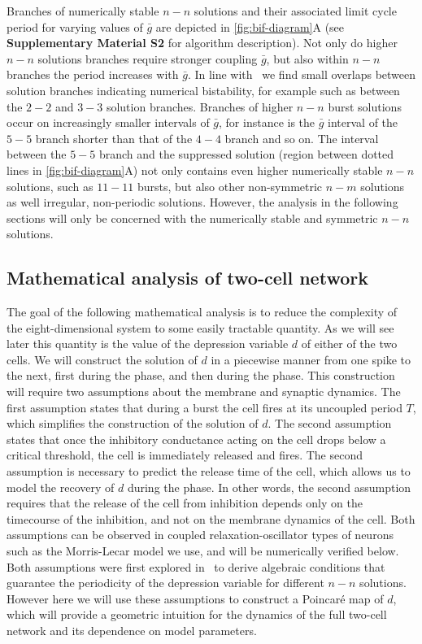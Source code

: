 Branches of numerically stable \(n-n\) solutions and their associated limit cycle period for varying values of \(\bar g\) are depicted in \cref{fig:bif-diagram}A (see \textbf{Supplementary Material S2} for algorithm description).
Not only do higher \(n-n\) solutions branches require stronger coupling \(\bar g\), but also within \(n-n\) branches the period increases with \(\bar g\).
In line with~\citet{bose2011} we find small overlaps between solution branches indicating numerical bistability, for example such as between the \(2-2\) and \(3-3\) solution branches.
Branches of higher \(n-n\) burst solutions occur on increasingly smaller intervals of \(\bar g\), for instance is the \(\bar g\) interval of the \(5-5\) branch shorter than that of the \(4-4\) branch and so on.
The interval between the \(5-5\) branch and the suppressed solution (region between dotted lines in \cref{fig:bif-diagram}A) not only contains even higher numerically stable \(n-n\) solutions, such as \(11-11\) bursts, but also other non-symmetric \(n-m\) solutions as well irregular, non-periodic solutions.
However, the analysis in the following sections will only be concerned with the numerically stable and symmetric \(n-n\) solutions.

\subsection{Mathematical analysis of two-cell network}
\label{sec:assumptions}
The goal of the following mathematical analysis is to reduce the complexity of the
eight-dimensional system to some easily tractable quantity.
As we will see later this quantity is the value of the depression variable \(d\) of either of the two cells.
We will construct the solution of \(d\) in a piecewise manner from one spike to the next, first during the \free{} phase, and then during the \quiet{} phase.
This construction will require two assumptions about the membrane and synaptic dynamics.
The first assumption states that during a burst the \free{} cell fires at its uncoupled period \(T\), which simplifies the construction of the solution of \(d\).
The second assumption states that once the inhibitory conductance acting on the \quiet{} cell drops below a critical threshold, the cell is immediately released and fires.
The second assumption is necessary to predict the release time of the \quiet{} cell, which allows us to model the recovery of \(d\) during the \quiet{} phase.
In other words, the second assumption requires that the release of the \quiet{} cell from inhibition depends only on the timecourse of the inhibition, and not on the membrane dynamics of the \quiet{} cell.
Both assumptions can be observed in coupled relaxation-oscillator types of neurons such as the Morris-Lecar model we use, and will be numerically verified below.
Both assumptions were first explored in~\cite{bose2011} to derive algebraic conditions that guarantee the periodicity of the depression variable for different \(n-n\) solutions.
However here we will use these assumptions to construct a Poincaré map of \(d\), which will provide a geometric intuition for the dynamics of the full two-cell network and its dependence on model parameters.

